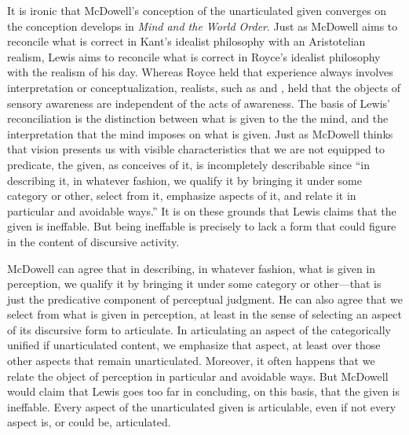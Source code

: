 \documentclass[12pt]{article}
\begin{document}
It is ironic that McDowell's conception of the unarticulated given converges on the conception \citet{Lewis:1929fk} develops in \emph{Mind and the World Order}. Just as McDowell aims to reconcile what is correct in Kant's idealist philosophy with an Aristotelian realism, Lewis aims to reconcile what is correct in Royce's idealist philosophy with the realism of his day. Whereas Royce held that experience always involves interpretation or conceptualization, realists, such as \citet{Russell:1912uq} and \citet{Moore:1903uo}, held that the objects of sensory awareness are independent of the acts of awareness. The basis of Lewis' reconciliation is the distinction between what is given to the the mind, and the interpretation that the mind imposes on what is given. Just as McDowell thinks that vision presents us with visible characteristics that we are not equipped to predicate, the given, as \citet[52]{Lewis:1929fk} conceives of it, is incompletely describable since ``in describing it, in whatever fashion, we qualify it by bringing it under some category or other, select from it, emphasize aspects of it, and relate it in particular and avoidable ways.'' It is on these grounds that Lewis claims that the given is ineffable. But being ineffable is precisely to lack a form that could figure in the content of discursive activity.

McDowell can agree that in describing, in whatever fashion, what is given in perception, we qualify it by bringing it under some category or other---that is just the predicative component of perceptual judgment. He can also agree that we select from what is given in perception, at least in the sense of selecting an aspect of its discursive form to articulate. In articulating an aspect of the categorically unified if unarticulated content, we emphasize that aspect, at least over those other aspects that remain unarticulated. Moreover, it often happens that we  relate the object of perception in particular and avoidable ways. But McDowell would claim that Lewis goes too far in concluding, on this basis, that the given is ineffable. Every aspect of the unarticulated given is articulable, even if not every aspect is, or could be, articulated.
\end{document}
